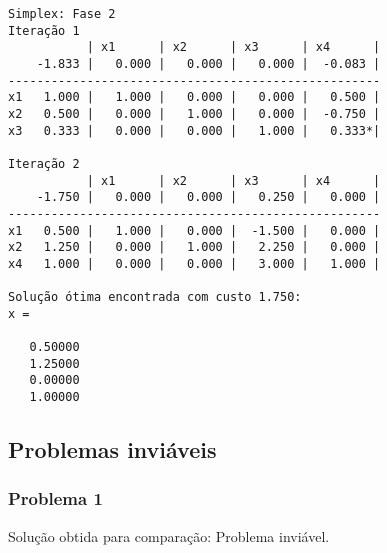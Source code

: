 \documentclass[brazil,times]{abnt}
\begin{document}
{\begin{verbatim}
Simplex: Fase 2
Iteração 1
           | x1      | x2      | x3      | x4      |
    -1.833 |   0.000 |   0.000 |   0.000 |  -0.083 |
----------------------------------------------------
x1   1.000 |   1.000 |   0.000 |   0.000 |   0.500 |
x2   0.500 |   0.000 |   1.000 |   0.000 |  -0.750 |
x3   0.333 |   0.000 |   0.000 |   1.000 |   0.333*|

Iteração 2
           | x1      | x2      | x3      | x4      |
    -1.750 |   0.000 |   0.000 |   0.250 |   0.000 |
----------------------------------------------------
x1   0.500 |   1.000 |   0.000 |  -1.500 |   0.000 |
x2   1.250 |   0.000 |   1.000 |   2.250 |   0.000 |
x4   1.000 |   0.000 |   0.000 |   3.000 |   1.000 |

Solução ótima encontrada com custo 1.750:
x =

   0.50000
   1.25000
   0.00000
   1.00000
\end{verbatim} }


\subsection*{Problemas inviáveis}
\subsubsection*{Problema 1}
Solução obtida para comparação: Problema inviável.
\end{document}
